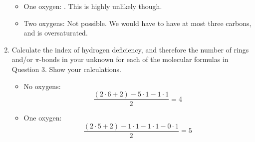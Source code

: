 \documentclass[titlepage]{article}
\begin{document}
\begin{enumerate}
\begin{itemize}
        \item One oxygen: . This is highly unlikely though.
        \item Two oxygens: Not possible. We would have to have at most three carbons, and  is oversaturated.
    \end{itemize}
    \item Calculate the index of hydrogen deficiency, and therefore the number of rings and/or $\pi$-bonds in your unknown for each of the molecular formulas in Question 3. Show your calculations.
    \begin{itemize}
        \item No oxygens:
        \begin{equation*}
            \frac{(2\cdot 6+2)-5\cdot 1-1\cdot 1}{2} = 4
        \end{equation*}
        \item One oxygen:
        \begin{equation*}
            \frac{(2\cdot 5+2)-1\cdot 1-1\cdot 1-0\cdot 1}{2} = 5
        \end{equation*}
    \end{itemize}
\end{enumerate}
\end{document}
